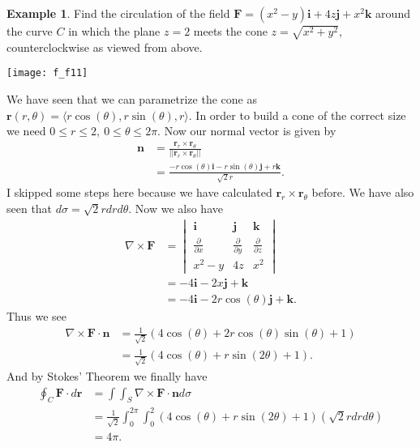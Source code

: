 \documentclass[12pt, letter]{article}
\theoremstyle{plain}
\numberwithin{theorem}{section}
\theoremstyle{definition}
\newtheorem{example}[theorem]{Example}
\begin{document}
\bigskip

\hrulefill

\bigskip

\begin{example}
Find the circulation of the field $\bm{F}=(x^2-y)\bm{i}+4z\bm{j}+x^2\bm{k}$ around the curve $C$ in which the plane $z=2$ meets the cone $z=\sqrt{x^2+y^2}$, counterclockwise as viewed from above.

\bigskip

\begin{center}
\texttt{[image: f\_f11]}
\end{center}

\bigskip

We have seen that we can parametrize the cone as $\bm{r}(r,\theta) = \langle r\cos(\theta),r\sin(\theta),r\rangle$. In order to build a cone of the correct size we need $0\leq r\leq 2, \ 0\leq \theta \leq 2\pi$. Now our normal vector is given by
\begin{align*}
\bm{n} &= \frac{\bm{r}_r\times\bm{r}_\theta}{||\bm{r}_r\times\bm{r}_\theta||}\\
&= \frac{-r\cos(\theta)\bm{i}-r\sin(\theta)\bm{j}+r\bm{k}}{\sqrt{2}r}.
\end{align*}
I skipped some steps here because we have calculated $\bm{r}_r\times\bm{r}_\theta$ before. We have also seen that $d\sigma = \sqrt{2}rdrd\theta$. Now we also have
\begin{align*}
\nabla \times \bm{F} &= \begin{vmatrix} \bm{i} & \bm{j} & \bm{k} \\ \frac{\partial}{\partial x} & \frac{\partial}{\partial y} & \frac{\partial}{\partial z} \\ x^2-y & 4z & x^2 \end{vmatrix}\\
&= -4\bm{i} - 2x\bm{j} + \bm{k}\\
&= -4\bm{i}-2r\cos(\theta)\bm{j}+\bm{k}.
\end{align*}
Thus we see
\begin{align*}
\nabla \times \bm{F} \cdot\bm{n} &= \frac{1}{\sqrt{2}}\left(4\cos(\theta)+2r\cos(\theta)\sin(\theta)+1\right)\\
&= \frac{1}{\sqrt{2}} \left(4\cos(\theta)+r\sin(2\theta)+1\right).
\end{align*}
And by Stokes' Theorem we finally have
\begin{align*}
\oint_C \bm{F}\cdot d\bm{r} &= \int\int_S \nabla \times \bm{F}\cdot \bm{n}d\sigma\\
&= \frac{1}{\sqrt{2}} \int_0^{2\pi} \int_0^2(4\cos(\theta)+r\sin(2\theta)+1)(\sqrt{2}rdrd\theta)\\
&=4\pi.
\end{align*}
\end{example}
\end{document}
